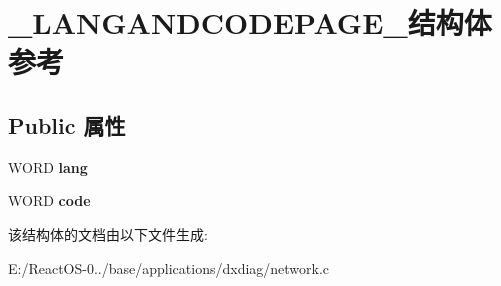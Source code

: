 \hypertarget{struct___l_a_n_g_a_n_d_c_o_d_e_p_a_g_e__}{}\section{\+\_\+\+L\+A\+N\+G\+A\+N\+D\+C\+O\+D\+E\+P\+A\+G\+E\+\_\+结构体 参考}
\label{struct___l_a_n_g_a_n_d_c_o_d_e_p_a_g_e__}
\subsection*{Public 属性}
\begin{DoxyCompactItemize}
\item 
\mbox{\label{struct___l_a_n_g_a_n_d_c_o_d_e_p_a_g_e___a11c3ef8175b1d07823cbea167f55eff1}} 
W\+O\+RD {\bfseries lang}
\item 
\mbox{\label{struct___l_a_n_g_a_n_d_c_o_d_e_p_a_g_e___a0d878fe27c203a91a669390f85ae8c3f}} 
W\+O\+RD {\bfseries code}
\end{DoxyCompactItemize}


该结构体的文档由以下文件生成\+:\begin{DoxyCompactItemize}
\item 
E\+:/\+React\+O\+S-\/0../base/applications/dxdiag/network.\+c\end{DoxyCompactItemize}
